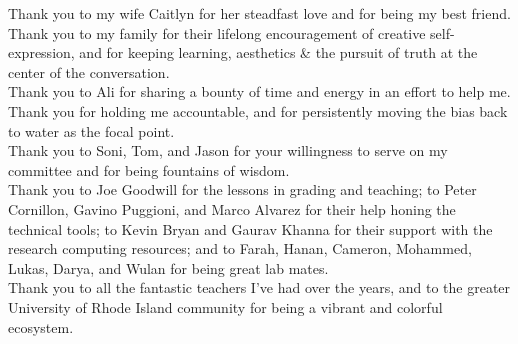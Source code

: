 \startacknowledgments

Thank you to my wife Caitlyn for her steadfast love and for being my best friend. \\

Thank you to my family for their lifelong encouragement of creative self-expression, and for keeping learning, aesthetics \& the pursuit of truth at the center of the conversation. \\

Thank you to Ali for sharing a bounty of time and energy in an effort to help me. Thank you for holding me accountable, and for persistently moving the bias back to water as the focal point. \\

Thank you to Soni, Tom, and Jason for your willingness to serve on my committee and for being fountains of wisdom. \\

Thank you to Joe Goodwill for the lessons in grading and teaching; to Peter Cornillon, Gavino Puggioni, and Marco Alvarez for their help honing the technical tools; to Kevin Bryan and Gaurav Khanna for their support with the research computing resources; and to Farah, Hanan, Cameron, Mohammed, Lukas, Darya, and Wulan for being great lab mates. \\

Thank you to all the fantastic teachers I've had over the years, and to the greater University of Rhode Island community for being a vibrant and colorful ecosystem.